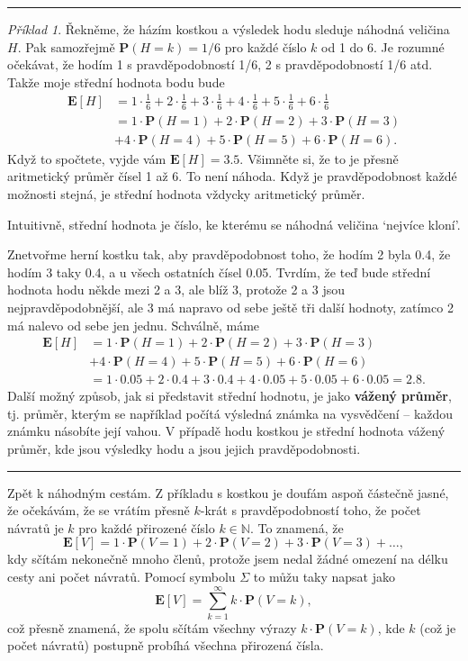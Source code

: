 \documentclass[a4paper,11pt]{article}
\theoremstyle{remark}
\newtheorem*{example}{Příklad}
\newcommand{\N}{\mathbb{N}}
\renewcommand{\P}{\mathbf{P}}
\newcommand{\E}{\mathbf{E}}
\begin{document}
\vspace{\parskip}
\hrule
\begin{example}
 Řekněme, že házím kostkou a výsledek hodu sleduje náhodná veličina $H$. Pak
 samozřejmě $\P(H = k) = 1 / 6$ pro každé číslo $k$ od 1 do 6. Je rozumné
 očekávat, že hodím 1 s pravděpodobností 1/6, 2 s pravděpodobností 1/6 atd.
 Takže moje střední hodnota bodu bude
 \begin{align*}
  \E[H] &= 1 \cdot \frac{1}{6} + 2 \cdot \frac{1}{6} + 3 \cdot \frac{1}{6} + 4
  \cdot \frac{1}{6} + 5 \cdot \frac{1}{6} + 6 \cdot \frac{1}{6}\\
  &= 1 \cdot \P(H = 1) + 2 \cdot \P(H = 2) + 3 \cdot \P(H = 3)\\
  &+4 \cdot \P(H = 4) + 5 \cdot \P(H = 5) + 6 \cdot \P(H = 6).
 \end{align*}
 Když to spočtete, vyjde vám $\E[H] = 3.5$. Všimněte si, že to je přesně
 aritmetický průměr čísel 1 až 6. To není náhoda. Když je pravděpodobnost každé
 možnosti stejná, je střední hodnota vždycky aritmetický průměr.

 Intuitivně, střední hodnota je číslo, ke kterému se náhodná veličina `nejvíce
 kloní'.

 Znetvořme herní kostku tak, aby pravděpodobnost toho, že hodím 2 byla 0.4, že
 hodím 3 taky 0.4, a u všech ostatních čísel 0.05. Tvrdím, že teď bude střední
 hodnota hodu někde mezi 2 a 3, ale blíž 3, protože 2 a 3 jsou
 nejpravděpodobnější, ale 3 má napravo od sebe ještě tři další hodnoty, zatímco
 2 má nalevo od sebe jen jednu. Schválně, máme
 \begin{align*}
  \E[H] &= 1 \cdot \P(H = 1) + 2 \cdot \P(H = 2) + 3 \cdot \P(H = 3)\\
  &+4 \cdot \P(H = 4) + 5 \cdot \P(H = 5) + 6 \cdot \P(H = 6)\\
  &=1 \cdot 0.05 + 2 \cdot 0.4 + 3 \cdot 0.4 + 4 \cdot 0.05 + 5 \cdot 0.05 + 6
  \cdot 0.05 = 2.8.
 \end{align*}
 Další možný způsob, jak si představit střední hodnotu, je jako \textbf{vážený
 průměr}, tj. průměr, kterým se například počítá výsledná známka na vysvědčení
 -- každou známku násobíte její vahou. V případě hodu kostkou je střední
 hodnota vážený průměr, kde  jsou výsledky hodu a  jsou
 jejich prav\-děpodobnosti.
\end{example}
\hrule
\vspace{\parskip}
Zpět k náhodným cestám. Z příkladu s kostkou je doufám aspoň částečně jasné, že
očekávám, že se vrátím přesně $k$-krát s pravděpodobností toho, že počet
návratů je $k$ pro každé přirozené číslo $k \in \N$. To znamená, že
\[
 \E[V] = 1 \cdot \P(V = 1) + 2 \cdot \P(V = 2) + 3 \cdot \P(V = 3) + \ldots,
\]
kdy sčítám nekonečně mnoho členů, protože jsem nedal žádné omezení na délku
cesty ani počet návratů. Pomocí symbolu $\Sigma$ to můžu taky napsat jako
\[
 \E[V] = \sum_{k=1}^{\infty} k \cdot \P(V=k),
\]
což přesně znamená, že spolu sčítám všechny výrazy $k \cdot \P(V=k)$, kde $k$
(což je počet návratů) postupně probíhá všechna přirozená čísla.
\end{document}
